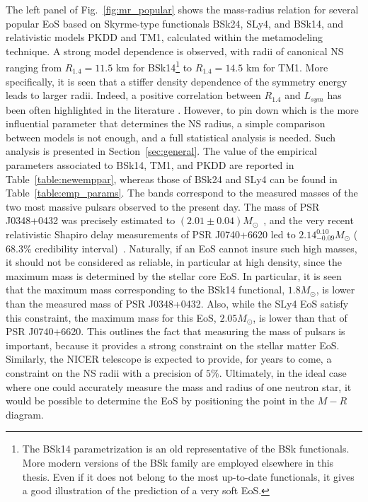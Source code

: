 The left panel of Fig.~\ref{fig:mr_popular} shows the mass-radius relation for 
several popular EoS based on Skyrme-type functionals BSk24, SLy4, and BSk14, 
and relativistic models PKDD and TM1, calculated within the metamodeling 
technique. A strong model dependence is observed, with radii of canonical NS 
ranging from $R_{1.4}=11.5$ km for BSk14\footnote{The BSk14 parametrization is
an old representative of the BSk functionals. More modern versions of the BSk
family are employed elsewhere in this thesis. Even if it does not belong to the
most up-to-date functionals, it gives a good illustration of the prediction of
a very soft EoS.} to $R_{1.4}=14.5$ km for TM1. More
specifically, it is seen that a stiffer density dependence of the symmetry
energy leads to larger radii. Indeed, a positive correlation between $R_{1.4}$
and $L_{sym}$ has been often highlighted in the literature
\cite{Alam2016,Ji2019,Hu2020}. However, to pin down which is the more
influential parameter that determines the NS radius, a simple comparison
between models is not enough, and a full statistical analysis is needed. Such
analysis is presented in Section~\ref{sec:general}. The value of the empirical 
parameters associated to BSk14, TM1, and PKDD are reported in 
Table~\ref{table:newemppar}, 
whereas those of BSk24 and SLy4 can be found in Table~\ref{table:emp_params}.
The bands correspond to the measured masses of the two most massive
pulsars observed to the present day. The mass of PSR J0348+0432 was precisely 
estimated to $(2.01\pm 0.04)M_\odot$~\cite{Antoniadis2013}, and the very recent
relativistic Shapiro delay measurements of PSR J0740+6620 led to 
$2.14_{-0.09}^{0.10}M_\odot$ ($68.3\%$ credibility
interval)~\cite{Cromartie2020}. Naturally, if an
EoS cannot insure such high masses, it should not be considered as reliable, 
in particular at high density, since the maximum mass is determined by the 
stellar core EoS. In particular, it is seen that the maximum mass corresponding
to the BSk14 functional, $1.8M_\odot$, is lower than the measured mass
of PSR J0348+0432. Also, while the SLy4 EoS satisfy this constraint, the maximum 
mass for this EoS, $2.05M_\odot$, is lower than that of PSR J0740+6620. This 
outlines the fact that measuring the mass of pulsars is important, because it 
provides a strong constraint on the stellar matter EoS. Similarly, the NICER
telescope is expected to provide, for years to come, a constraint on the NS
radii with a precision of $5\%$. Ultimately, in the ideal case where one could 
accurately measure the mass and radius of one neutron star, it would be 
possible to determine the EoS by positioning the point in the $M-R$ diagram.

